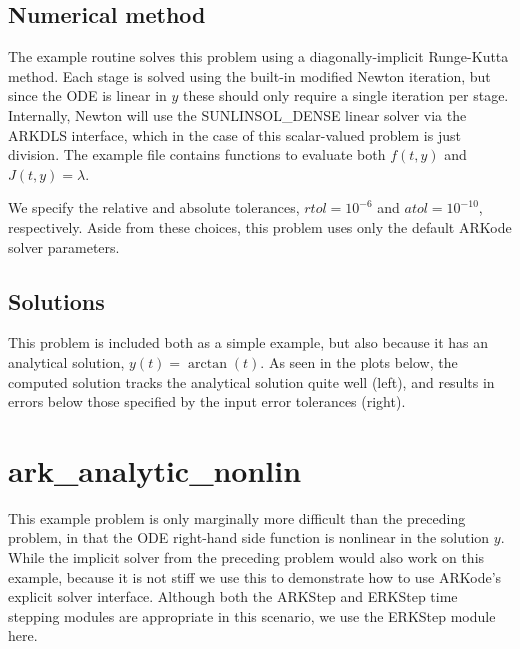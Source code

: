 \documentclass[letterpaper,10pt,english]{sphinxmanual}
\begin{document}
\subsection{Numerical method}
\label{\detokenize{c_serial:numerical-method}}
The example routine solves this problem using a diagonally-implicit
Runge-Kutta method.  Each stage is solved using the built-in modified
Newton iteration, but since the ODE is linear in \(y\) these
should only require a single iteration per stage.  Internally, Newton
will use the SUNLINSOL\_DENSE linear solver via the ARKDLS interface,
which in the case of this scalar-valued problem is just division.  The
example file contains functions to evaluate both \(f(t,y)\) and
\(J(t,y)=\lambda\).

We specify the relative and absolute tolerances, \(rtol=10^{-6}\)
and \(atol=10^{-10}\), respectively.  Aside from these choices,
this problem uses only the default ARKode solver parameters.


\subsection{Solutions}
\label{\detokenize{c_serial:solutions}}
This problem is included both as a simple example, but also because it
has an analytical solution, \(y(t) = \arctan(t)\).  As seen in the
plots below, the computed solution tracks the analytical solution
quite well (left), and results in errors below those specified by the input
error tolerances (right).

\noindent{}

\noindent{}


\section{ark\_analytic\_nonlin}
\label{\detokenize{c_serial:ark-analytic-nonlin}}\label{\detokenize{c_serial:id2}}
This example problem is only marginally more difficult than the
preceding problem, in that the ODE right-hand side function is
nonlinear in the solution \(y\).  While the implicit solver from
the preceding problem would also work on this example, because it is
not stiff we use this to demonstrate how to use ARKode’s explicit
solver interface.  Although both the ARKStep and ERKStep time stepping
modules are appropriate in this scenario, we use the ERKStep module
here.
\end{document}
